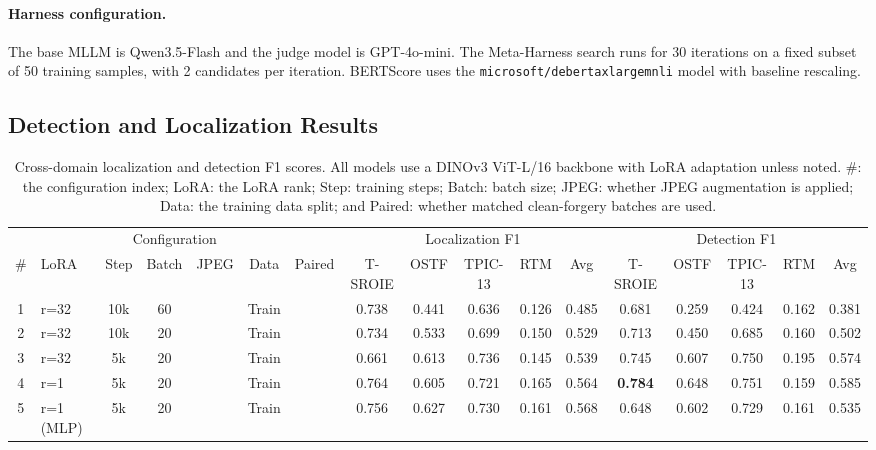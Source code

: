 \documentclass[sigconf, screen, review, anonymous]{acmart}
\newcommand{\cmark}{\ding{51}}
\newcommand{\xmark}{\ding{55}}
\begin{document}
\paragraph{Harness configuration.} The base MLLM is Qwen3.5-Flash and the judge model is GPT-4o-mini. The Meta-Harness search runs for 30 iterations on a fixed subset of 50 training samples, with 2 candidates per iteration. BERTScore uses the \texttt{micro\-soft/}\discretionary{}{}{}\texttt{deberta\-xlarge\-mnli} model with baseline rescaling.

\subsection{Detection and Localization Results}

\begin{table}[t]
    \caption{Cross-domain localization and detection F1 scores. All models use a DINOv3 ViT-L/16 backbone with LoRA adaptation unless noted. \#: the configuration index; LoRA: the LoRA rank; Step: training steps; Batch: batch size; JPEG: whether JPEG augmentation is applied; Data: the training data split; and Paired: whether matched clean-forgery batches are used.}
    \label{tab:loc_results}
    \centering
    \small
    \setlength{\tabcolsep}{2pt}
    \begin{tabular}{c|lccccc|ccccc|ccccc}
        \toprule
        \multicolumn{7}{c|}{Configuration} & \multicolumn{5}{c|}{Localization F1} & \multicolumn{5}{c}{Detection F1} \\
        \# & LoRA & Step & Batch & JPEG & Data & Paired & T-SROIE & OSTF & TPIC-13 & RTM & Avg & T-SROIE & OSTF & TPIC-13 & RTM & Avg \\
        \midrule
        1 & r=32 & 10k & 60 & \cmark & Train & \xmark & 0.738 & 0.441 & 0.636 & 0.126 & 0.485 & 0.681 & 0.259 & 0.424 & 0.162 & 0.381 \\
        2 & r=32 & 10k & 20 & \cmark & Train & \xmark & 0.734 & 0.533 & 0.699 & 0.150 & 0.529 & 0.713 & 0.450 & 0.685 & 0.160 & 0.502 \\
        3 & r=32 & 5k & 20 & \cmark & Train & \xmark & 0.661 & 0.613 & 0.736 & 0.145 & 0.539 & 0.745 & 0.607 & 0.750 & 0.195 & 0.574 \\
        4 & r=1 & 5k & 20 & \cmark & Train & \xmark & 0.764 & 0.605 & 0.721 & 0.165 & 0.564 & \textbf{0.784} & 0.648 & 0.751 & 0.159 & 0.585 \\
        5 & r=1 (MLP) & 5k & 20 & \cmark & Train & \xmark & 0.756 & 0.627 & 0.730 & 0.161 & 0.568 & 0.648 & 0.602 & 0.729 & 0.161 & 0.535 \\

\end{tabular}
\end{table}
\end{document}
